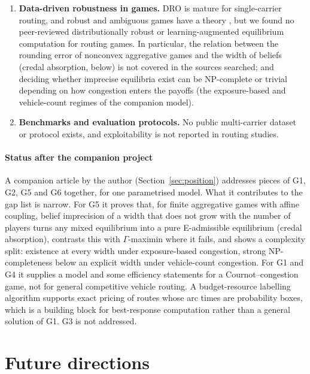 \documentclass[preprint,12pt]{elsarticle}
\newcommand{\gap}[1]{\textbf{#1}}
\begin{document}
\begin{enumerate}[leftmargin=*,label=\gap{G\arabic*}.,itemsep=4pt]
\item \gap{Data-driven robustness in games.} DRO is mature for single-carrier routing, and robust and ambiguous games have a theory \cite{Aghassi2006,Beauchene2016,Crespi2025,Feik2026}, but we found no peer-reviewed distributionally robust or learning-augmented equilibrium computation for routing games. In particular, the relation between the rounding error of nonconvex aggregative games and the width of beliefs (credal absorption, below) is not covered in the sources searched; and deciding whether imprecise equilibria exist can be NP-complete or trivial depending on how congestion enters the payoffs (the exposure-based and vehicle-count regimes of the companion model).
\item \gap{Benchmarks and evaluation protocols.} No public multi-carrier dataset or protocol exists, and exploitability is not reported in routing studies.
\end{enumerate}

\paragraph{Status after the companion project} A companion article by the author (Section~\ref{sec:position}) addresses pieces of G1, G2, G5 and G6 together, for one parametrised model. What it contributes to the gap list is narrow. For G5 it proves that, for finite aggregative games with affine coupling, belief imprecision of a width that does not grow with the number of players turns any mixed equilibrium into a pure E-admissible equilibrium (credal absorption), contrasts this with $\Gamma$-maximin where it fails, and shows a complexity split: existence at every width under exposure-based congestion, strong NP-completeness below an explicit width under vehicle-count congestion. For G1 and G4 it supplies a model and some efficiency statements for a Cournot--congestion game, not for general competitive vehicle routing. A budget-resource labelling algorithm supports exact pricing of routes whose arc times are probability boxes, which is a building block for best-response computation rather than a general solution of G1. G3 is not addressed.

\section{Future directions}\label{sec:future}
\end{document}
